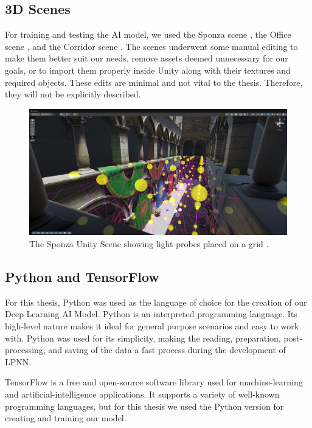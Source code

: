 \subsection{3D Scenes}
For training and testing the AI model, we used the Sponza scene \parencite{Sponza2017}, the Office scene \parencite{Office2021}, and the Corridor scene \parencite{Corridor2021}. The scenes underwent some manual editing to make them better suit our needs, remove assets deemed unnecessary for our goals, or to import them properly inside Unity along with their textures and required objects. These edits are minimal and not vital to the thesis. Therefore, they will not be explicitly described.

\begin{figure}[h]
	\centering
	\includegraphics[width=\linewidth]{Graphics/Sponza_lightprobes.jpg}
	\caption{The Sponza Unity Scene showing light probes placed on a grid \parencite{Sponza2017}.}
	\label{fig:Sponza_lp}
\end{figure}


\subsection{Python and TensorFlow}
For this thesis, Python was used as the language of choice for the creation of our Deep Learning AI Model. Python is an interpreted programming language. Its high-level nature makes it ideal for general purpose scenarios and easy to work with. Python was used for its simplicity, making the reading, preparation, post-processing, and saving of the data a fast process during the development of LPNN.\newline

TensorFlow is a free and open-source software library used for machine-learning and artificial-intelligence applications. It supports a variety of well-known programming languages, but for this thesis we used the Python version for creating and training our model.

